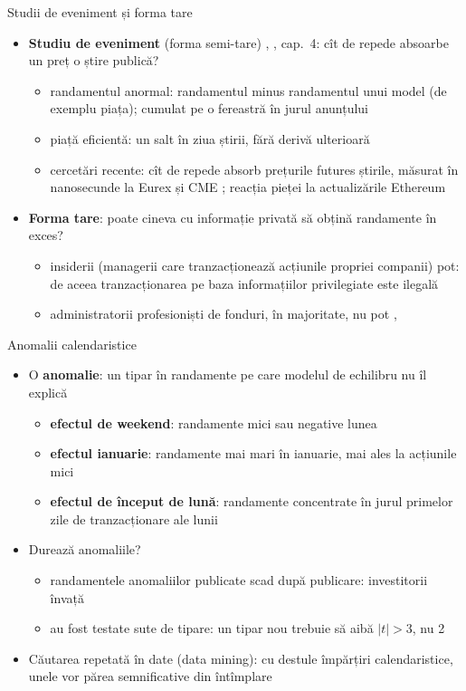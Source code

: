 \begin{frame}{Studii de eveniment și forma tare}
\itemsize{\small}
\begin{itemize}
    \item \textbf{Studiu de eveniment} (forma semi-tare) , , cap.~4: cît de repede absoarbe un preț o știre publică?
    \begin{itemize}
        \item randamentul anormal: randamentul minus randamentul unui model (de exemplu piața); cumulat pe o fereastră în jurul anunțului
        \item piață eficientă: un salt în ziua știrii, fără derivă ulterioară
        \item cercetări recente: cît de repede absorb prețurile futures știrile, măsurat în nanosecunde la Eurex și CME ; reacția pieței la actualizările Ethereum 
    \end{itemize}
    \item \textbf{Forma tare}: poate cineva cu informație privată să obțină randamente în exces?
    \begin{itemize}
        \item insiderii (managerii care tranzacționează acțiunile propriei companii) pot: de aceea tranzacționarea pe baza informațiilor privilegiate este ilegală
        \item administratorii profesioniști de fonduri, în majoritate, nu pot , 
    \end{itemize}
\end{itemize}
\end{frame}

\begin{frame}{Anomalii calendaristice}
\itemsize{\small}
\begin{itemize}
    \item O \textbf{anomalie}: un tipar în randamente pe care modelul de echilibru nu îl explică
    \begin{itemize}
        \item \textbf{efectul de weekend}: randamente mici sau negative lunea 
        \item \textbf{efectul ianuarie}: randamente mai mari în ianuarie, mai ales la acțiunile mici 
        \item \textbf{efectul de început de lună}: randamente concentrate în jurul primelor zile de tranzacționare ale lunii 
    \end{itemize}
    \item Durează anomaliile?
    \begin{itemize}
        \item randamentele anomaliilor publicate scad după publicare: investitorii învață 
        \item au fost testate sute de tipare: un tipar nou trebuie să aibă $|t| > 3$, nu 2 
    \end{itemize}
    \item Căutarea repetată în date (data mining): cu destule împărțiri calendaristice, unele vor părea semnificative din întîmplare
\end{itemize}
\end{frame}

